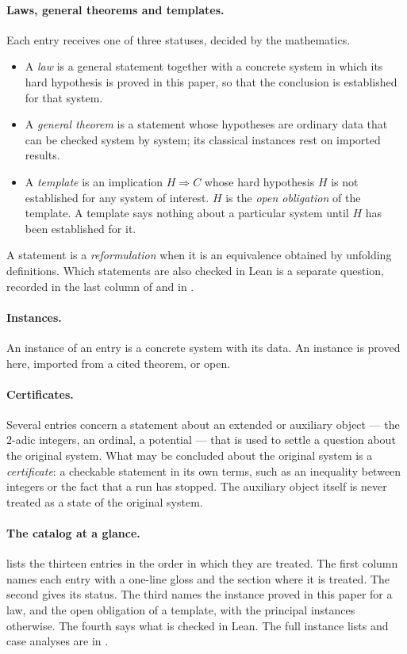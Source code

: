 \paragraph{Laws, general theorems and templates.} Each entry receives one of three statuses,
decided by the mathematics.
\begin{itemize}
  \item A \emph{law} is a general statement together with a concrete system in which its hard
    hypothesis is proved in this paper, so that the conclusion is established for that system.
  \item A \emph{general theorem} is a statement whose hypotheses are ordinary data that can be
    checked system by system; its classical instances rest on imported results.
  \item A \emph{template} is an implication $H \Rightarrow C$ whose hard hypothesis $H$ is not
    established for any system of interest. $H$ is the \emph{open obligation} of the template. A
    template says nothing about a particular system until $H$ has been established for it.
\end{itemize}
A statement is a \emph{reformulation} when it is an equivalence obtained by unfolding definitions.
Which statements are also checked in Lean is a separate question, recorded in the last column of
 and in .

\paragraph{Instances.} An instance of an entry is a concrete system with its data. An instance is
proved here, imported from a cited theorem, or open.

\paragraph{Certificates.} Several entries concern a statement about an extended or auxiliary object
--- the $2$-adic integers, an ordinal, a potential --- that is used to settle a question about the
original system. What may be concluded about the original system is a \emph{certificate}: a
checkable statement in its own terms, such as an inequality between integers or the fact that a
run has stopped. The auxiliary object itself is never treated as a state of the original system.

\paragraph{The catalog at a glance.}  lists the thirteen entries in the order in
which they are treated. The first column names each entry with a one-line gloss and the section
where it is treated. The second gives its status. The third names the instance proved in this
paper for a law, and the open obligation of a template, with the principal instances otherwise.
The fourth says what is checked in Lean. The full instance lists and case analyses are in
.

